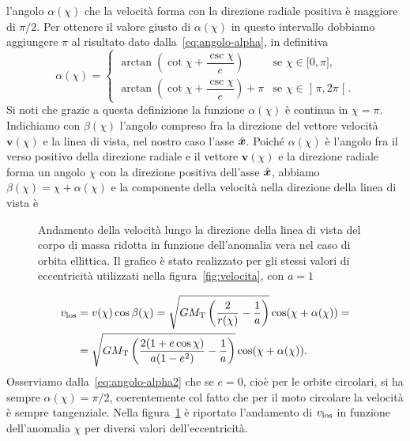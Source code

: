 {l'angolo $\alpha(\chi)$ che la velocità forma con la direzione radiale positiva
è maggiore di $\pi/2$. Per ottenere il valore giusto di $\alpha(\chi)$ in questo
intervallo dobbiamo aggiungere $\pi$ al risultato dato
dalla~\eqref{eq:angolo-alpha}, in definitiva
\begin{equation}
  \label{eq:angolo-alpha2}
  \alpha(\chi) =
  \begin{cases}
    \arctan
     \left(
    \cot\chi + \dfrac{\csc\chi}{e}
  \right) & \text{se } \chi \in \mathopen{[}0, \pi\mathclose{]},\\[2ex]
  \arctan
  \left(
    \cot\chi + \dfrac{\csc\chi}{e}
  \right) + \pi & \text{se } \chi \in \mathopen{]}\pi, 2\pi\mathclose{[}.
  \end{cases}
\end{equation}
Si noti che grazie a questa definizione la funzione $\alpha(\chi)$ è continua
in $\chi = \pi$. Indichiamo con $\beta(\chi)$ l'angolo compreso fra la
direzione del vettore velocità $\bm{v}(\chi)$ e la linea di vista, nel nostro
caso l'asse $\hat{\bm{x}}$. Poiché $\alpha(\chi)$ è l'angolo fra il verso
positivo della direzione radiale e il vettore $\bm{v}(\chi)$ e la direzione
radiale forma un angolo $\chi$ con la direzione positiva dell'asse
$\hat{\bm{x}}$, abbiamo $\beta(\chi) = \chi + \alpha(\chi)$ e la componente
della velocità nella direzione della linea di vista è
\begin{figure}
  \centering
  
  \caption[Andamento della velocità nella direzione della di vista in funzione
  dell'anomalia
  vera]{Andamento della velocità lungo la direzione della linea di vista del
    corpo di massa ridotta in funzione dell'anomalia vera nel caso di orbita
    ellittica. Il grafico è stato realizzato per gli stessi valori di
    eccentricità utilizzati nella figura~\ref{fig:velocita}, con $a=1$}
  \label{fig:velocita-los}
\end{figure}
\begin{equation}
  \begin{split}
    v_\textup{los} &= v(\chi)\cos\beta(\chi) = \sqrt{GM_\textup{T} \left(
      \frac{2}{r(\chi)} - \frac{1}{a}
    \right)}\cos(\chi + \alpha(\chi)) = \\
    &= \sqrt{GM_\textup{T}
    \left(
      \frac{2(1+e\cos\chi)}{a(1-e^2)} - \frac{1}{a}
    \right)}\cos(\chi + \alpha(\chi)).
  \end{split}
\end{equation}
Osserviamo dalla~\eqref{eq:angolo-alpha2} che se $e=0$, cioè per le orbite
circolari, si ha sempre $\alpha(\chi) = \pi/2$, coerentemente col fatto che
per il moto circolare la velocità è sempre tangenziale. Nella
figura~\ref{fig:velocita-los} è riportato l'andamento di $v_\textup{los}$ in
funzione dell'anomalia $\chi$ per diversi valori dell'eccentricità.

}
